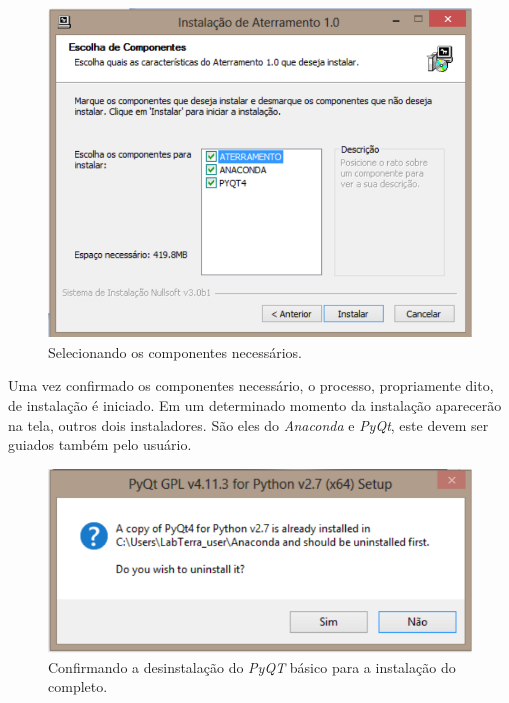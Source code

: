\documentclass[a4paper, 10pt]{article}
\begin{document}
\begin{figure}[!h]
        \caption{\label{fig_selecionando_componentes_externos}Selecionando os componentes necessários.}
	    \begin{center}
            \includegraphics[scale=0.7]{../fotos/instalacao/parte2_selecionando_componentes.pdf}
	    \end{center}
\end{figure}

Uma vez confirmado os componentes necessário, o processo, propriamente dito, de instalação 
é iniciado. Em um determinado momento da instalação aparecerão na tela, outros dois instaladores. 
São eles do \textit{Anaconda} e \textit{PyQt}, este devem ser guiados também pelo usuário.

\begin{figure}[!h]
    \caption{\label{fig_pyqt_antigo}Confirmando a desinstalação do \textit{PyQT} básico para a instalação do completo.}
	    \begin{center}
            \includegraphics[scale=0.6]{../fotos/instalacao/parte6_pyqt.pdf}
	    \end{center}
\end{figure}
\end{document}
